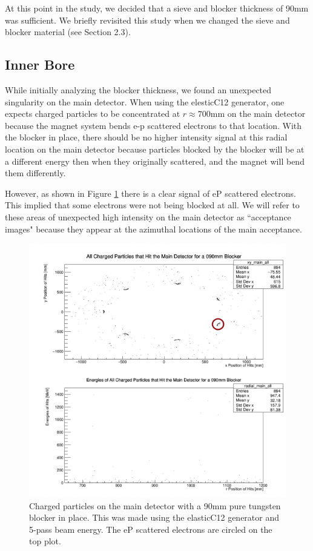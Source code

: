 At this point in the study, we decided that a sieve and blocker thickness of 90mm was sufficient. We briefly revisited this study when we changed the sieve and blocker material (see Section 2.3).

\subsection{Inner Bore}

While initially analyzing the blocker thickness, we found an unexpected singularity on the main detector. When using the elesticC12 generator, one expects charged particles to be concentrated at $r\approx700$mm on the main detector because the magnet system bends e-p scattered electrons to that location. With the blocker in place, there should be no higher intensity signal at this radial location on the main detector because particles blocked by the blocker will be at a different energy then when they originally scattered, and the magnet will bend them differently. 

However, as shown in Figure \ref{fig:coll2_image} there is a clear signal of eP scattered electrons. This implied that some electrons were not being blocked at all. We will refer to these areas of unexpected high intensity on the main detector as ``acceptance images" because they appear at the azimuthal locations of the main acceptance.

\begin{figure}[H]
    \centering
    \includegraphics[scale=0.5]{Images/CharegedParticlesMainDetColl2Image_Blocker_10202021.png}
    \caption{Charged particles on the main detector with a 90mm pure tungsten blocker in place. This was made using the elasticC12 generator and 5-pass beam energy. The eP scattered electrons are circled on the top plot.}
    \label{fig:coll2_image}
\end{figure}

